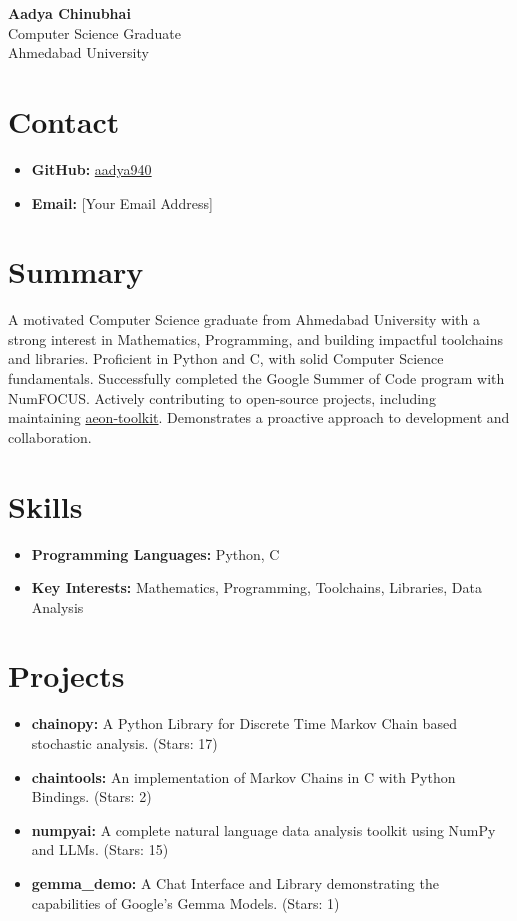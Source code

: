 \documentclass{article}
\begin{document}
\begin{center}
    \Large\textbf{Aadya Chinubhai} \\
    \normalsize Computer Science Graduate \\
    \normalsize Ahmedabad University
\end{center}

\section*{Contact}
\begin{itemize}
    \item \textbf{GitHub:} \href{https://github.com/aadya940}{aadya940}
    \item \textbf{Email:} [Your Email Address] %
\end{itemize}

\section*{Summary}
A motivated Computer Science graduate from Ahmedabad University with a strong interest in Mathematics, Programming, and building impactful toolchains and libraries. Proficient in Python and C, with solid Computer Science fundamentals. Successfully completed the Google Summer of Code program with NumFOCUS. Actively contributing to open-source projects, including maintaining \href{https://github.com/aeon-toolkit}{aeon-toolkit}. Demonstrates a proactive approach to development and collaboration.

\section*{Skills}
\begin{itemize}
    \item \textbf{Programming Languages:} Python, C
    \item \textbf{Key Interests:} Mathematics, Programming, Toolchains, Libraries, Data Analysis
\end{itemize}

\section*{Projects}
\begin{itemize}
    \item \textbf{chainopy:} A Python Library for Discrete Time Markov Chain based stochastic analysis. (Stars: 17)
    \item \textbf{chaintools:} An implementation of Markov Chains in C with Python Bindings. (Stars: 2)
    \item \textbf{numpyai:} A complete natural language data analysis toolkit using NumPy and LLMs. (Stars: 15)
    \item \textbf{gemma\_demo:} A Chat Interface and Library demonstrating the capabilities of Google's Gemma Models. (Stars: 1)
\end{itemize}
\end{document}
